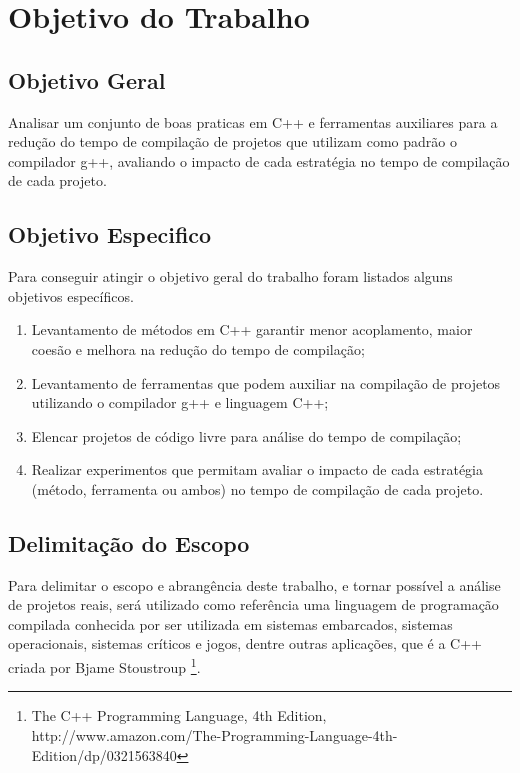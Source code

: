 \section{Objetivo do Trabalho}

\subsection{Objetivo Geral}

Analisar um conjunto de boas praticas em C++ e ferramentas auxiliares
 para a redução do tempo de compilação de projetos que utilizam como
 padrão o compilador g++, avaliando o impacto de cada estratégia no
 tempo de compilação de cada projeto.

\subsection{Objetivo Especifico}

Para conseguir atingir o objetivo geral do trabalho foram listados
 alguns objetivos específicos.


\begin{enumerate}
    \item Levantamento de  métodos em C++ garantir menor acoplamento,
 maior coesão e melhora na redução do tempo de compilação;
    \item Levantamento de ferramentas que podem auxiliar na compilação
 de projetos utilizando o compilador g++ e linguagem C++;
    \item Elencar projetos de código livre para análise do tempo de
 compilação;
    \item Realizar experimentos que permitam avaliar o impacto de cada
 estratégia (método, ferramenta ou ambos) no tempo de compilação de
 cada projeto.
\end{enumerate}

\subsection{Delimitação do Escopo}

Para delimitar o escopo e abrangência deste trabalho, e tornar possível
 a análise de projetos reais, será utilizado como referência uma linguagem
 de programação compilada conhecida por ser utilizada em sistemas embarcados,
 sistemas operacionais, sistemas críticos e jogos, dentre outras aplicações,
 que é a  C++ criada por Bjame Stoustroup \footnote{The C++ Programming
 Language, 4th Edition, http://www.amazon.com/The-Programming-Language-4th-Edition/dp/0321563840}.

